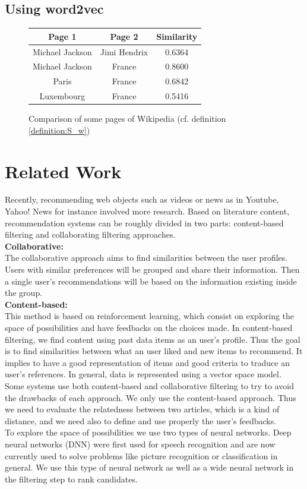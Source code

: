 \documentclass[11pt]{article}
\theoremstyle{plain}
\theoremstyle{definition}
\theoremstyle{remark}
\begin{document}
\subsection{Using word2vec}


\begin{figure}[hb]
    \caption{Comparison of some pages of Wikipedia (cf. definition \ref{definition:S_w})}
    \label{fig:similarity}
	\centering
	\begin{tabular}{c|c|c}
		Page 1			&	Page 2			&	Similarity \\
		\hline\hline
		Michael Jackson	&	Jimi Hendrix	&	0.6364	\\
		Michael Jackson	&	France			&	0.8600	\\
		Paris			&	France			&	0.6842	\\
		Luxembourg		&	France			&	0.5416	\\
  \end{tabular}
\end{figure}


\section{Related Work}
Recently, recommending web objects such as videos or news as in Youtube, Yahoo! News for instance involved more research. Based on literature content, recommendation systems can be roughly divided in two parts: content-based filtering and collaborating filtering approaches.\\
\textbf{Collaborative: }\\
The collaborative approach aims to find similarities between the user profiles. Users with similar preferences will be grouped and share their information. Then a single user's recommendations will be based on the information existing inside the group.\\
\textbf{Content-based: }\\ 
This method is based on reinforcement learning, which consist on exploring the space of possibilities and have feedbacks on the choices made. In content-based filtering, we find content using past data items as an user's profile. Thus the goal is to find similarities between what an user liked and new items to recommend. It implies to have a good representation of items and good criteria to traduce an user's references. In general, data is represented using a vector space model.\\
Some systems use both content-based and collaborative filtering to try to avoid the drawbacks of each approach. We only use the content-based approach. Thus we need to evaluate the relatedness between two articles, which is a kind of distance, and we need also to define and use properly the user's feedbacks.\\
To explore the space of possibilities we use two types of neural networks. Deep neural networks (DNN) were first used for speech recognition and are now currently used to solve problems like picture recognition or classification in general. We use this type of neural network as well as a wide neural network in the filtering step to rank candidates.




\end{document}
